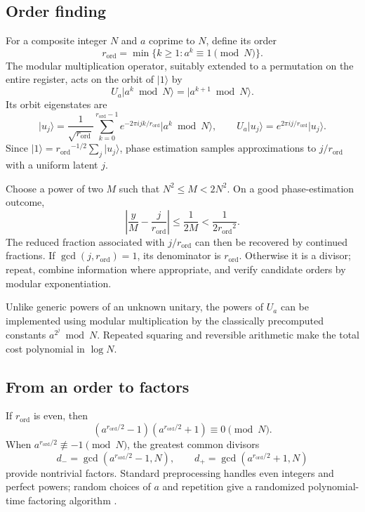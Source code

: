 \documentclass[11pt,a4paper]{article}
\newcommand{\ket}[1]{\lvert #1\rangle}
\newcommand{\rord}{r_{\mathrm{ord}}}
\DeclareMathOperator{\gcdop}{gcd}
\theoremstyle{definition}
\theoremstyle{remark}
\numberwithin{equation}{section}
\begin{document}
\subsection{Order finding}
For a composite integer $N$ and $a$ coprime to $N$, define its order
\begin{equation}
 {\rord}=\min\{k\geq1:a^k\equiv1\pmod N\}.
\end{equation}
The modular multiplication operator, suitably extended to a permutation on
the entire register, acts on the orbit of $\ket{1}$ by
\begin{equation}
 U_a\ket{a^k\bmod N}=\ket{a^{k+1}\bmod N}.
\end{equation}
Its orbit eigenstates are
\begin{equation}
 \ket{u_j}=\frac1{\sqrt {\rord}}\sum_{k=0}^{{\rord}-1}
 e^{-2\pi ijk/{\rord}}\ket{a^k\bmod N},\qquad
 U_a\ket{u_j}=e^{2\pi ij/{\rord}}\ket{u_j}.
\end{equation}
Since $\ket{1}={\rord}^{-1/2}\sum_j\ket{u_j}$, phase estimation samples
approximations to $j/{\rord}$ with a uniform latent $j$.

Choose a power of two $M$ such that $N^2\leq M<2N^2$. On a good
phase-estimation outcome,
\begin{equation}
 \left|\frac yM-\frac{j}{\rord}\right|\leq\frac1{2M}<\frac1{2{\rord}^2}.
\end{equation}
The reduced fraction associated with $j/{\rord}$ can then be recovered by
continued fractions. If $\gcdop(j,{\rord})=1$, its denominator is ${\rord}$.
Otherwise it is a divisor; repeat, combine information where appropriate,
and verify candidate orders by modular exponentiation.

Unlike generic powers of an unknown unitary, the powers of $U_a$ can be
implemented using modular multiplication by the classically precomputed
constants $a^{2^j}\bmod N$. Repeated squaring and reversible arithmetic make
the total cost polynomial in $\log N$.

\subsection{From an order to factors}
If ${\rord}$ is even, then
\begin{equation}
 (a^{{\rord}/2}-1)(a^{{\rord}/2}+1)\equiv0\pmod N.
\end{equation}
When $a^{{\rord}/2}\not\equiv-1\pmod N$, the greatest common divisors
\begin{equation}
 d_-=\gcdop(a^{{\rord}/2}-1,N),\qquad d_+=\gcdop(a^{{\rord}/2}+1,N)
\end{equation}
provide nontrivial factors. Standard preprocessing handles even integers
and perfect powers; random choices of $a$ and repetition give a randomized
polynomial-time factoring algorithm \citep{shor1997}.
\end{document}
